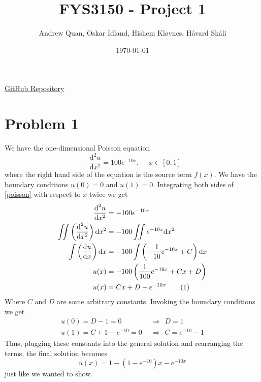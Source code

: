 \documentclass[english,notitlepage]{revtex4-1}  %
\newcommand{\imp}{\hspace{5pt}\Rightarrow\hspace{5pt}}
\newcommand\numberthis{\addtocounter{equation}{1}\tag{\theequation}}
\begin{document}
\title{\textbf{FYS3150 - Project 1}}
\author{Andrew Quan, Oskar Idland, Hishem Kløvnes, Håvard Skåli}
\date{\today}                             %
\noaffiliation      




\maketitle 
    
\href{https://github.com/Oskar-Idland/FYS3150-ComputationalPhysic}{GitHub Repository}
    
\section*{Problem 1}
We have the one-dimensional Poisson equation
\begin{equation}
    -\frac{\text{d}^2 u}{\text{d}x^2} = 100e^{-10x}, \hspace{15pt} x \in [0,1] \label{poisson}
\end{equation}
where the right hand side of the equation is the source term $f(x)$. We have the boundary conditions $u(0) = 0$ and $u(1) = 0$. Integrating both sides of \cref{poisson} with respect to $x$ twice we get
\begin{align*}
    \frac{\text{d}^2 u}{\text{d}x^2} &= -100e^{-10x} \\
    \iint \left( \frac{\text{d}^2 u}{\text{d}x^2} \right) \text{d}x^2 &= -100\iint e^{-10x} \text{d}x^2 \\
    \int \left( \frac{\text{d}u}{\text{d}x}\right) \text{d}x &= -100\int \left(-\frac{1}{10}e^{-10x} + C\right)\text{d}x \\
    u(x) &= -100\left(\frac{1}{100}e^{-10x} + Cx + D\right) \\
    u(x) &= Cx + D - e^{-10x} \numberthis \label{general sol}
\end{align*}
Where $C$ and $D$ are some arbitrary constants. Invoking the boundary conditions we get
\begin{align*}
    u(0) = D - 1 = 0 &\imp D = 1 \\
    u(1) = C + 1 - e^{-10} = 0 &\imp C = e^{-10} - 1
\end{align*}
Thus, plugging these constants into the general solution and rearranging the terms, the final solution becomes
\begin{equation}
    u(x) = 1 - \left(1 - e^{-10}\right)x - e^{-10x} \label{final sol}
\end{equation}
just like we wanted to show.
\end{document}
